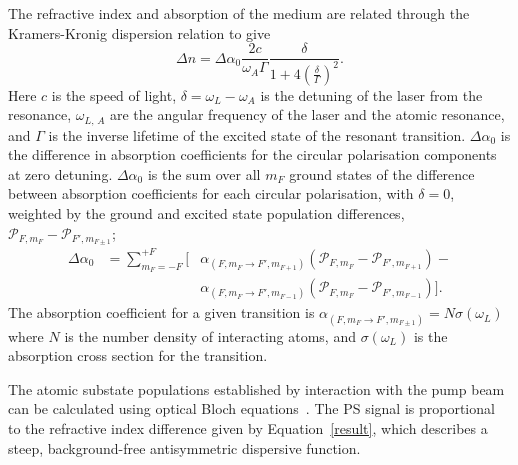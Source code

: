 The refractive index and absorption of the medium are related through the Kramers-Kronig dispersion relation to give~\cite{demtroder_laser_2003}
\begin{equation}
\Delta n = \Delta\alpha_0 \frac{2c}{\omega_A \Gamma}\frac{\delta}{1+4\left(\frac{\delta}{\Gamma}\right)^2}.\label{result}
\end{equation}
Here $c$ is the speed of light, $\delta=\omega_L-\omega_A$ is the detuning of the laser from the resonance, $\omega_{L,\,A}$ are the angular frequency of the laser and the atomic resonance, and $\Gamma$ is the inverse lifetime of the excited state of the resonant transition.
$\Delta\alpha_0$ is the difference in absorption coefficients for the circular polarisation components at zero detuning.
$\Delta\alpha_0$ is the sum over all $m_F$ ground states of the difference between absorption coefficients for each circular polarisation, with $\delta=0$, weighted by the ground and excited state population differences, $\mathcal{P}_{F,m_F}-\mathcal{P}_{F',m_{F\pm1}}$;
\begin{eqnarray}
\Delta\alpha_0 &= \sum_{m_F=-F}^{+F} \Bigg[&\alpha_{(F,m_F\rightarrow F',m_{F+1})}(\mathcal{P}_{F,m_F}-\mathcal{P}_{F',m_{F+1}})-\nonumber\\
&&\alpha_{(F,m_F\rightarrow F',m_{F-1})}(\mathcal{P}_{F,m_F}-\mathcal{P}_{F',m_{F-1}})\Bigg].
\end{eqnarray}
The absorption coefficient for a given transition is $\alpha_{(F, m_F\rightarrow F',m_{F\pm1})}=N \sigma(\omega_L)$ where $N$ is the number density of interacting atoms, and $\sigma(\omega_L)$ is the absorption cross section for the transition.

The atomic substate populations established by interaction with the pump beam can be calculated using optical Bloch equations~\cite{hughes_polarization_2009}.
The PS signal is proportional to the refractive index difference given by Equation~\ref{result}, which describes a steep, background-free antisymmetric dispersive function.

